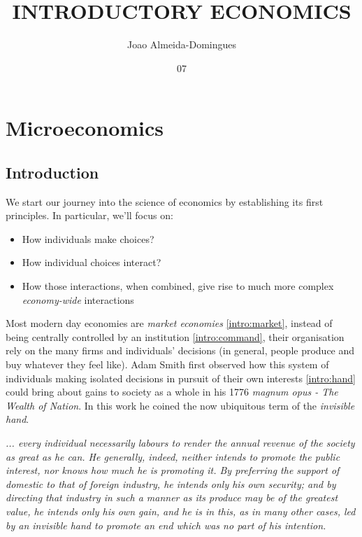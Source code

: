 \documentclass[english,course]{Notes}
\title{ INTRODUCTORY ECONOMICS}
\author{Joao Almeida-Domingues}
\date{07}{01}{2019}
\newcommand\quo[1]{\begin{displayquote}\ita{\large{#1}}\end{displayquote}}
\newcommand{\ita}[1]{\textit{#1}}
\begin{document}
\newpage

\section{Microeconomics}

\subsection{Introduction}

We start our journey into the science of economics by establishing its first principles. In particular, we'll focus on:

\begin{itemize}
	\item How individuals make choices?
	\item How individual choices interact?
	\item How those interactions, when combined, give rise to much more complex \ita{economy-wide} interactions
\end{itemize}



\par{Most modern day economies are \ita{market economies} \ref{intro:market}, instead of being centrally controlled by an institution \ref{intro:command}, their organisation rely on the many firms and individuals' decisions (in general, people produce and buy whatever they feel like). Adam Smith first observed how this system of individuals making isolated decisions in pursuit of their own interests \ref{intro:hand} could bring about gains to society as a whole in his 1776 \ita{magnum opus - The Wealth of Nation}. In this work he coined the now ubiquitous term of the \ita{invisible hand}.}

\quo{... every individual necessarily labours to render the annual revenue of the society as great as he can. He generally, indeed, neither intends to promote the public interest, nor knows how much he is promoting it. By preferring the support of domestic to that of foreign industry, he intends only his own security; and by directing that industry in such a manner as its produce may be of the greatest value, he intends only his own gain, and he is in this, as in many other cases, led by an invisible hand to promote an end which was no part of his intention.}
\end{document}
